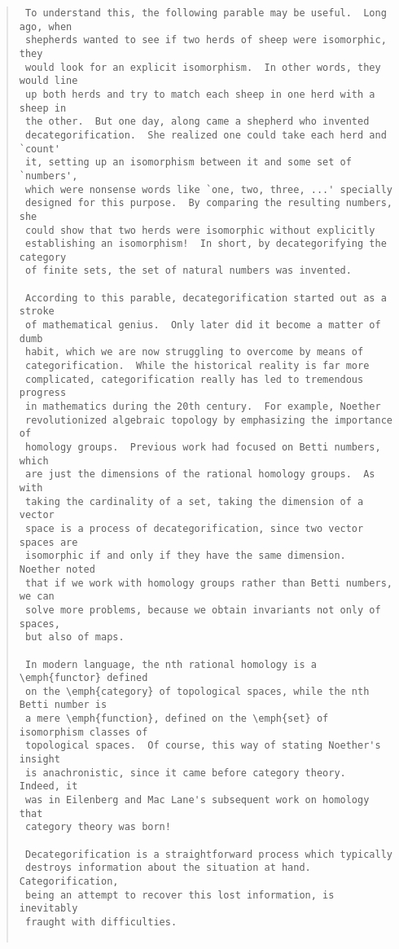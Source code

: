 \begin{quote}
\begin{verbatim}
 To understand this, the following parable may be useful.  Long ago, when
 shepherds wanted to see if two herds of sheep were isomorphic, they
 would look for an explicit isomorphism.  In other words, they would line
 up both herds and try to match each sheep in one herd with a sheep in
 the other.  But one day, along came a shepherd who invented
 decategorification.  She realized one could take each herd and `count'
 it, setting up an isomorphism between it and some set of `numbers',
 which were nonsense words like `one, two, three, ...' specially
 designed for this purpose.  By comparing the resulting numbers, she
 could show that two herds were isomorphic without explicitly
 establishing an isomorphism!  In short, by decategorifying the category
 of finite sets, the set of natural numbers was invented.   

 According to this parable, decategorification started out as a stroke
 of mathematical genius.  Only later did it become a matter of dumb
 habit, which we are now struggling to overcome by means of
 categorification.  While the historical reality is far more
 complicated, categorification really has led to tremendous progress 
 in mathematics during the 20th century.  For example, Noether
 revolutionized algebraic topology by emphasizing the importance of
 homology groups.  Previous work had focused on Betti numbers, which
 are just the dimensions of the rational homology groups.  As with
 taking the cardinality of a set, taking the dimension of a vector
 space is a process of decategorification, since two vector spaces are
 isomorphic if and only if they have the same dimension.  Noether noted
 that if we work with homology groups rather than Betti numbers, we can
 solve more problems, because we obtain invariants not only of spaces,
 but also of maps.  

 In modern language, the nth rational homology is a \emph{functor} defined
 on the \emph{category} of topological spaces, while the nth Betti number is
 a mere \emph{function}, defined on the \emph{set} of isomorphism classes of
 topological spaces.  Of course, this way of stating Noether's insight
 is anachronistic, since it came before category theory.  Indeed, it
 was in Eilenberg and Mac Lane's subsequent work on homology that
 category theory was born!
 
 Decategorification is a straightforward process which typically
 destroys information about the situation at hand.  Categorification,
 being an attempt to recover this lost information, is inevitably
 fraught with difficulties.


\end{verbatim}
\end{quote}
